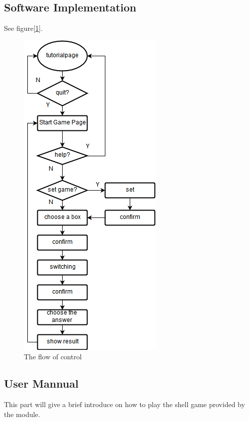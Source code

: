 \subsection{Software Implementation}
See figure[\ref{fig:flow}].
\begin{figure}[!htbp]
	\centering
	\includegraphics{images/flowchart.png}
	\caption{The flow of control}
	\label{fig:flow}
\end{figure}

\subsection{User Mannual}
This part will give a brief introduce on how to play the shell game provided by the module.
